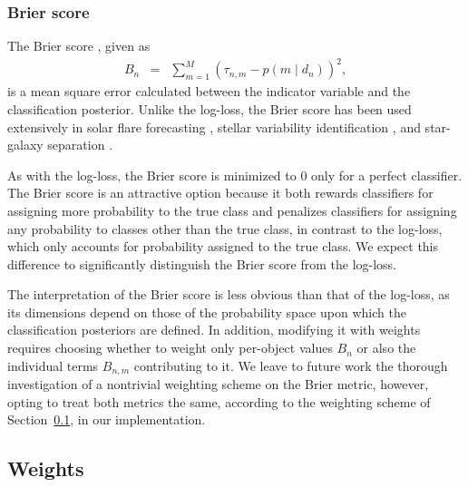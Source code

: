 \subsubsection{Brier score}
\label{sec:brier}

The Brier score \citep{brier_verification_1950}, given as
\begin{eqnarray}
  \label{eq:brier}
  B_{n} &=& \sum_{m=1}^{M} (\tau_{n, m} - p(m \mid d_{n}))^{2},
\end{eqnarray}
is a mean square error calculated between the indicator variable and the classification posterior.
Unlike the log-loss, the Brier score has been used extensively in solar flare forecasting \citep{crown_validation_2012, mays_ensemble_2015, florios_forecasting_2018}, stellar variability identification \citep{richards_construction_2012, armstrong_k2_2016}, and star-galaxy separation \citep{kim_hybrid_2015}.

As with the log-loss, the Brier score is minimized to $0$ only for a perfect classifier.
The Brier score is an attractive option because it both rewards classifiers for  assigning more probability to the true class and penalizes classifiers for assigning any probability to classes other than the true class, in contrast to the log-loss, which only accounts for probability assigned to the true class.
We expect this difference to significantly distinguish the Brier score from the log-loss.

The interpretation of the Brier score is less obvious than that of the log-loss, as its dimensions depend on those of the probability space upon which the classification posteriors are defined.
In addition, modifying it with weights requires choosing whether to weight only per-object values $B_{n}$ or also the individual terms $B_{n, m}$ contributing to it.
We leave to future work the thorough investigation of a nontrivial weighting scheme on the Brier metric, however, opting to treat both metrics the same, according to the weighting scheme of Section~\ref{sec:weights}, in our implementation.

\subsection{Weights}
\label{sec:weights}

